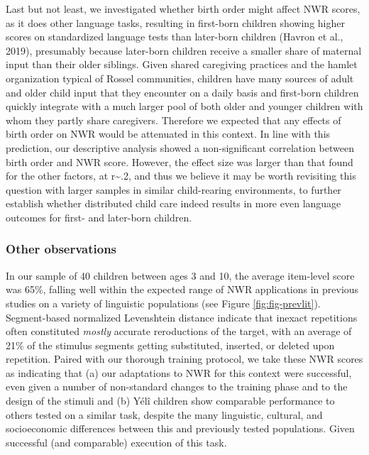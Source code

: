 \documentclass[english,,man,floatsintext]{apa6}
\begin{document}
Last but not least, we investigated whether birth order might affect NWR scores, as it does other language tasks, resulting in first-born children showing higher scores on standardized language tests than later-born children (Havron et al., 2019), presumably because later-born children receive a smaller share of maternal input than their older siblings. Given shared caregiving practices and the hamlet organization typical of Rossel communities, children have many sources of adult and older child input that they encounter on a daily basis and first-born children quickly integrate with a much larger pool of both older and younger children with whom they partly share caregivers. Therefore we expected that any effects of birth order on NWR would be attenuated in this context. In line with this prediction, our descriptive analysis showed a non-significant correlation between birth order and NWR score. However, the effect size was larger than that found for the other factors, at r\textasciitilde{}.2, and thus we believe it may be worth revisiting this question with larger samples in similar child-rearing environments, to further establish whether distributed child care indeed results in more even language outcomes for first- and later-born children.

\hypertarget{other-observations}{%
\subsubsection{Other observations}\label{other-observations}}

In our sample of 40 children between ages 3 and 10, the average item-level score was 65\%, falling well within the expected range of NWR applications in previous studies on a variety of linguistic populations (see Figure \ref{fig:fig-prevlit}). Segment-based normalized Levenshtein distance indicate that inexact repetitions often constituted \emph{mostly} accurate reroductions of the target, with an average of 21\% of the stimulus segments getting substituted, inserted, or deleted upon repetition. Paired with our thorough training protocol, we take these NWR scores as indicating that (a) our adaptations to NWR for this context were successful, even given a number of non-standard changes to the training phase and to the design of the stimuli and (b) Yélî children show comparable performance to others tested on a similar task, despite the many linguistic, cultural, and socioeconomic differences between this and previously tested populations. Given successful (and comparable) execution of this task.
\end{document}
